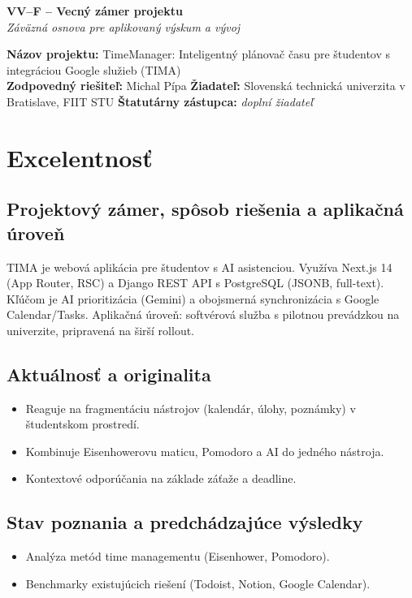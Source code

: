\documentclass[11pt,a4paper]{article}
\begin{document}
\begin{center}
{\Large \textbf{VV–F – Vecný zámer projektu}}\\[2pt]
\textit{Záväzná osnova pre aplikovaný výskum a vývoj}
\end{center}

\noindent\textbf{Názov projektu:} TimeManager: Inteligentný plánovač času pre študentov s integráciou Google služieb (TIMA)\\
\textbf{Zodpovedný riešiteľ:} Michal Pípa \quad
\textbf{Žiadateľ:} Slovenská technická univerzita v Bratislave, FIIT STU \quad
\textbf{Štatutárny zástupca:} \emph{doplní žiadateľ}

\section{Excelentnosť}
\subsection{Projektový zámer, spôsob riešenia a aplikačná úroveň}
TIMA je webová aplikácia pre študentov s AI asistenciou. Využíva Next.js 14 (App Router, RSC) a Django REST API s PostgreSQL (JSONB, full-text).
Kľúčom je AI prioritizácia (Gemini) a obojsmerná synchronizácia s Google Calendar/Tasks.
Aplikačná úroveň: softvérová služba s pilotnou prevádzkou na univerzite, pripravená na širší rollout.

\subsection{Aktuálnosť a originalita}
\begin{itemize}
\item Reaguje na fragmentáciu nástrojov (kalendár, úlohy, poznámky) v študentskom prostredí.
\item Kombinuje Eisenhowerovu maticu, Pomodoro a AI do jedného nástroja.
\item Kontextové odporúčania na základe záťaže a deadline.
\end{itemize}

\subsection{Stav poznania a predchádzajúce výsledky}
\begin{itemize}
\item Analýza metód time managementu (Eisenhower, Pomodoro).
\item Benchmarky existujúcich riešení (Todoist, Notion, Google Calendar).
\end{itemize}
\end{document}
